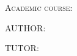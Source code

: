 \vspace*{15mm}

\begin{center}
    {\large \textsc{Academic course:} \thesisAcademicCourse}
\end{center}

\vspace*{15mm}

\begin{center}
    AUTHOR:
    \par
    \textbf{{\large \thesisAuthor}}
\end{center}

\begin{center}
    TUTOR:
    \par
    \textbf{{\large \thesisTutor}}
\end{center}

\begin{center}
    \vspace*{1mm}
    {\large \thesisDepartment}
\end{center}

\newpage
\thispagestyle{empty}
\restoregeometry
